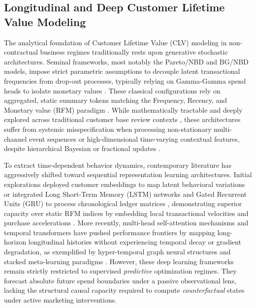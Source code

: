 \documentclass[10pt, conference]{IEEEtran}
\begin{document}
\subsection{Longitudinal and Deep Customer Lifetime Value Modeling}
The analytical foundation of Customer Lifetime Value (CLV) modeling in non-contractual business regimes traditionally rests upon generative stochastic architectures. Seminal frameworks, most notably the Pareto/NBD \cite{Schmittlein1987} and BG/NBD \cite{Fader2005a} models, impose strict parametric assumptions to decouple latent transactional frequencies from drop-out processes, typically relying on Gamma-Gamma spend heads to isolate monetary values \cite{FaderHardieGamma}. These classical configurations rely on aggregated, static summary tokens matching the Frequency, Recency, and Monetary value (RFM) paradigm \cite{Fader2005b}. While mathematically tractable and deeply explored across traditional customer base review contexts \cite{Berger1998, Jain2002, Gupta2006}, these architectures suffer from systemic misspecification when processing non-stationary multi-channel event sequences or high-dimensional time-varying contextual features, despite hierarchical Bayesian or fractional updates \cite{Abe2009, Glady2009}.

To extract time-dependent behavior dynamics, contemporary literature has aggressively shifted toward sequential representation learning architectures. Initial explorations deployed customer embeddings to map latent behavioral variations \cite{Chamberlain2017} or integrated Long Short-Term Memory (LSTM) networks and Gated Recurrent Units (GRU) to process chronological ledger matrices \cite{Sifa2018}, demonstrating superior capacity over static RFM indices by embedding local transactional velocities and purchase accelerations \cite{Chen2025}. More recently, multi-head self-attention mechanisms and temporal transformers \cite{Vaswani2017} have pushed performance frontiers by mapping long-horizon longitudinal histories without experiencing temporal decay or gradient degradation, as exemplified by hyper-temporal graph neural structures \cite{Zhao2026} and stacked meta-learning paradigms \cite{Gadgil2023}. However, these deep learning frameworks remain strictly restricted to supervised \textit{predictive} optimization regimes. They forecast absolute future spend boundaries under a passive observational lens, lacking the structural causal capacity required to compute \textit{counterfactual} states under active marketing interventions.
\end{document}
